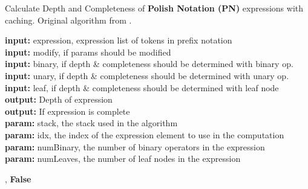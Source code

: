 \documentclass[12pt]{iopart}
\begin{document}
\begin{algorithm}
\scriptsize
\caption{Calculate Depth and Completeness of \textbf{Polish Notation (PN)} expressions with caching. Original algorithm from \cite{77180279}.}
\label{alg:getPNdepth_cache}
\hspace*{\algorithmicindent} \textbf{input:}  expression, expression list of tokens in prefix notation \\
\hspace*{\algorithmicindent} \textbf{input:}  modify, if params should be modified \\
\hspace*{\algorithmicindent} \textbf{input:}  binary, if depth \& completeness should be determined with binary op.  \\
\hspace*{\algorithmicindent} \textbf{input:}  unary, if depth \& completeness should be determined with unary op.  \\
\hspace*{\algorithmicindent} \textbf{input:} leaf, if depth \& completeness should be determined with leaf node \\
\hspace*{\algorithmicindent} \textbf{output:} Depth of expression\\
\hspace*{\algorithmicindent} \textbf{output:} If expression is complete \\
\hspace*{\algorithmicindent} \textbf{param:} stack, the stack used in the algorithm \\
\hspace*{\algorithmicindent} \textbf{param:} idx, the index of the expression element to use in the computation\\
\hspace*{\algorithmicindent} \textbf{param:} numBinary, the number of binary operators in the expression \\
\hspace*{\algorithmicindent} \textbf{param:} numLeaves, the number of leaf nodes in the expression 
\begin{algorithmic}[1]

        \State {}, \textbf{False}
    \EndIf


\end{algorithmic}
\end{algorithm}
\end{document}
